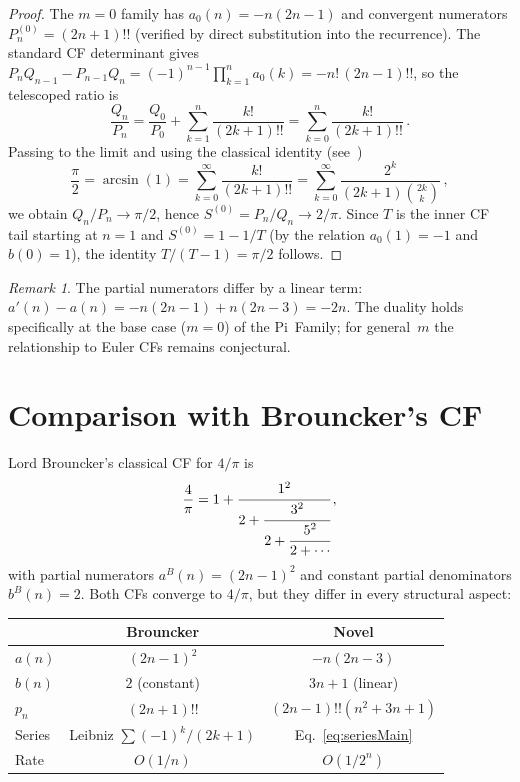 \documentclass[11pt]{article}
\newcommand{\dff}[1]{(#1)!!}
\theoremstyle{remark}
\newtheorem{remark}[theorem]{Remark}
\begin{document}
\begin{proof}
The $m{=}0$ family has $a_0(n) = -n(2n{-}1)$ and
convergent numerators $P_n^{(0)} = (2n{+}1)!!$
(verified by direct substitution into the recurrence).
The standard CF determinant gives
$P_n Q_{n-1} - P_{n-1} Q_n = (-1)^{n-1}\prod_{k=1}^n a_0(k)
= -n!\,(2n{-}1)!!$,
so the telescoped ratio is
\[
  \frac{Q_n}{P_n}
  = \frac{Q_0}{P_0}
    + \sum_{k=1}^{n} \frac{k!}{\dff{2k{+}1}}
  = \sum_{k=0}^{n} \frac{k!}{\dff{2k{+}1}}\,.
\]
Passing to the limit and using the classical identity
(see~\cite[\S4.24.2]{dlmf})
\begin{equation}\label{eq:arcsin}
  \frac{\pi}{2} = \arcsin(1)
  = \sum_{k=0}^{\infty}\frac{k!}{\dff{2k{+}1}}
  = \sum_{k=0}^{\infty}\frac{2^k}{(2k{+}1)\binom{2k}{k}}\,,
\end{equation}
we obtain $Q_n/P_n \to \pi/2$, hence
$S^{(0)} = P_n/Q_n \to 2/\pi$.
Since $T$ is the inner CF tail starting at $n{=}1$ and
$S^{(0)} = 1 - 1/T$
(by the relation $a_0(1) = -1$ and $b(0) = 1$),
the identity $T/(T{-}1) = \pi/2$ follows.
\end{proof}

\begin{remark}
The partial numerators differ by a linear term:
$a'(n) - a(n) = -n(2n{-}1) + n(2n{-}3) = -2n$.
The duality holds specifically at the base case ($m=0$) of the
Pi~Family; for general~$m$ the relationship to Euler CFs remains
conjectural.
\end{remark}


\section{Comparison with Brouncker's CF}\label{sec:brouncker}

Lord Brouncker's classical CF for $4/\pi$ is
\[
  \frac{4}{\pi}
  = 1 + \cfrac{1^2}{2 + \cfrac{3^2}{2 + \cfrac{5^2}{2 + \cdots}}}\,,
\]
with partial numerators $a^B(n) = (2n{-}1)^2$ and constant partial
denominators $b^B(n) = 2$.  Both CFs converge to $4/\pi$, but they
differ in every structural aspect:

\begin{center}
\begin{tabular}{@{}lcc@{}}
  \toprule
  & \textbf{Brouncker} & \textbf{Novel} \\
  \midrule
  $a(n)$ & $(2n{-}1)^2$ & $-n(2n{-}3)$ \\
  $b(n)$ & $2$ (constant) & $3n{+}1$ (linear) \\
  $p_n$ & $(2n{+}1)!!$ & $\dff{2n{-}1}(n^2{+}3n{+}1)$ \\
  Series & Leibniz $\sum (-1)^k/(2k{+}1)$ & Eq.~\eqref{eq:seriesMain} \\
  Rate & $O(1/n)$ & $O(1/2^n)$ \\
  \bottomrule
\end{tabular}
\end{center}
\end{document}
